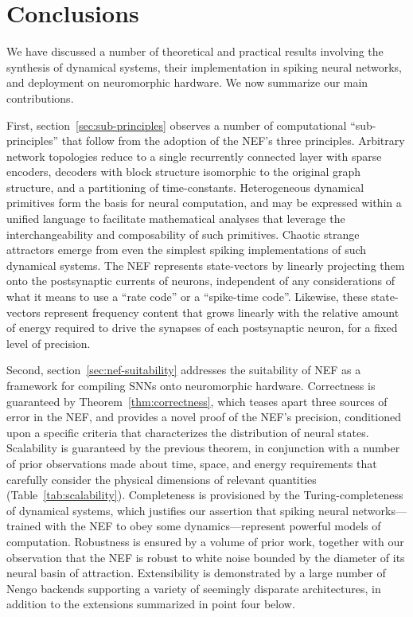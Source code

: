 \chapter{Conclusions}
\label{chapt:conclusions}

We have discussed a number of theoretical and practical results involving the synthesis of dynamical systems, their implementation in spiking neural networks, and deployment on neuromorphic hardware.
We now summarize our main contributions.

First, section~\ref{sec:sub-principles} observes a number of computational ``sub-principles'' that follow from the adoption of the NEF's three principles.
Arbitrary network topologies reduce to a single recurrently connected layer with sparse encoders, decoders with block structure isomorphic to the original graph structure, and a partitioning of time-constants.
Heterogeneous dynamical primitives form the basis for neural computation, and may be expressed within a unified language to facilitate mathematical analyses that leverage the interchangeability and composability of such primitives.
Chaotic strange attractors emerge from even the simplest spiking implementations of such dynamical systems.
The NEF represents state-vectors by linearly projecting them onto the postsynaptic currents of neurons,  independent of any considerations of what it means to use a ``rate code'' or a ``spike-time code''.
Likewise, these state-vectors represent frequency content that grows linearly with the relative amount of energy required to drive the synapses of each postsynaptic neuron, for a fixed level of precision.

Second, section~\ref{sec:nef-suitability} addresses the suitability of NEF as a framework for compiling SNNs onto neuromorphic hardware.
Correctness is guaranteed by Theorem~\ref{thm:correctness}, which teases apart three sources of error in the NEF, and provides a novel proof of the NEF's precision, conditioned upon a specific criteria that characterizes the distribution of neural states.
Scalability is guaranteed by the previous theorem, in conjunction with a number of prior observations made about time, space, and energy requirements that carefully consider the physical dimensions of relevant quantities (Table~\ref{tab:scalability}).
Completeness is provisioned by the Turing-completeness of dynamical systems, which justifies our assertion that spiking neural networks---trained with the NEF to obey some dynamics---represent powerful models of computation.
Robustness is ensured by a volume of prior work, together with our observation that the NEF is robust to white noise bounded by the diameter of its neural basin of attraction.
Extensibility is demonstrated by a large number of Nengo backends supporting a variety of seemingly disparate architectures, in addition to the extensions summarized in point four below.

